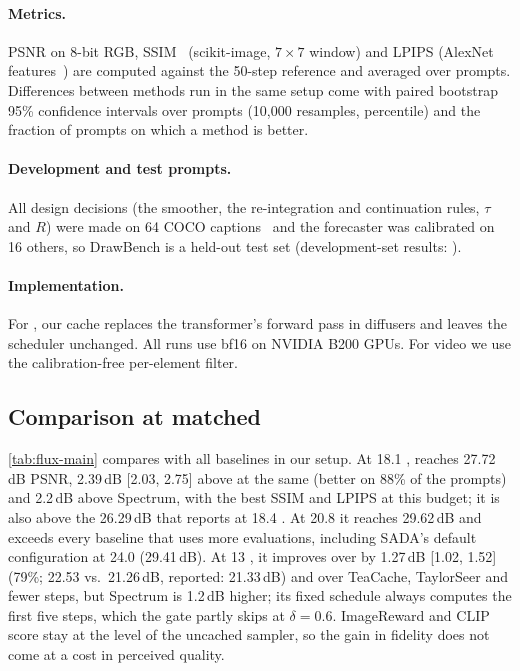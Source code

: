 \paragraph{Metrics.}
PSNR on 8-bit RGB, SSIM~\cite{wang2004ssim} (scikit-image, $7{\times}7$ window) and LPIPS (AlexNet
features~\cite{zhang2018lpips}) are computed against the 50-step reference and averaged over prompts. Differences
between methods run in the same setup come with paired bootstrap 95\% confidence intervals over prompts (10{,}000
resamples, percentile) and the fraction of prompts on which a method is better.

\paragraph{Development and test prompts.}
All design decisions (the smoother, the re-integration and continuation rules, $\tau$ and $R$) were made on 64 COCO
captions~\cite{lin2014coco} and the forecaster was calibrated on 16 others, so DrawBench is a held-out test set
(development-set results: ).

\paragraph{Implementation.}
For \flux, our cache replaces the transformer's forward pass in diffusers and leaves the scheduler unchanged. All
runs use bf16 on NVIDIA B200 GPUs. For video we use the calibration-free per-element filter.

\subsection{Comparison at matched \nfe}
\label{sec:main-results}

\cref{tab:flux-main} compares \ours with all baselines in our setup. At 18.1 \nfe, \ours reaches 27.72\,dB PSNR,
2.39\,dB [2.03, 2.75] above \seacache at the same \nfe (better on 88\% of the prompts) and 2.2\,dB above Spectrum,
with the best SSIM and LPIPS at this budget; it is also above the 26.29\,dB that \seacache reports at 18.4 \nfe. At
20.8 \nfe it reaches 29.62\,dB and exceeds every baseline that uses more evaluations, including SADA's default
configuration at 24.0 \nfe (29.41\,dB). At 13 \nfe, it improves over \seacache by 1.27\,dB [1.02, 1.52] (79\%;
22.53 vs.\ 21.26\,dB, reported: 21.33\,dB) and over TeaCache, TaylorSeer and fewer steps, but Spectrum is 1.2\,dB
higher; its fixed schedule always computes the first five steps, which the \sea gate partly skips at $\delta=0.6$. ImageReward and CLIP score stay at the level of the uncached sampler, so the gain in fidelity does not
come at a cost in perceived quality.

